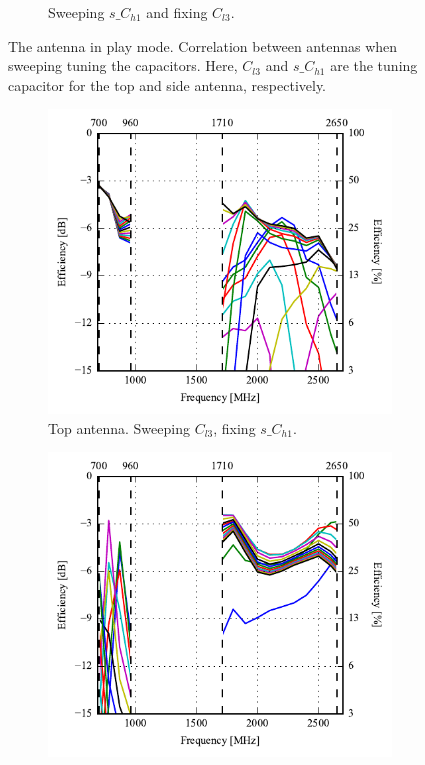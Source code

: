 \begin{figure}[htbp]
\begin{subfigure}{0.49\linewidth}
        \caption{Sweeping $s\_C_{h1}$ and fixing $C_{l3}$.}
    \end{subfigure}
    \caption{The antenna in play mode. Correlation between antennas when sweeping tuning the capacitors. Here, $C_{l3}$ and $s\_C_{h1}$ are the tuning capacitor for the top and side antenna, respectively.}
    \label{fig:corr_sol3_play}
\end{figure}

\begin{figure}[htbp]
    \centering
    \begin{subfigure}{0.49\linewidth}
        \centering
        \includegraphics{img/tech_sol/nonresonant/simulation/play_mode/EffSweepAC1/efficiency-ac1-top}
        \caption{Top antenna. Sweeping $C_{l3}$, fixing $s\_C_{h1}$.}
    \end{subfigure}
    \hfill
    \begin{subfigure}{0.49\linewidth}
        \centering
        \includegraphics{img/tech_sol/nonresonant/simulation/play_mode/EffSweepAC2/efficiency-ac2-side}

\end{subfigure}
\end{figure}
